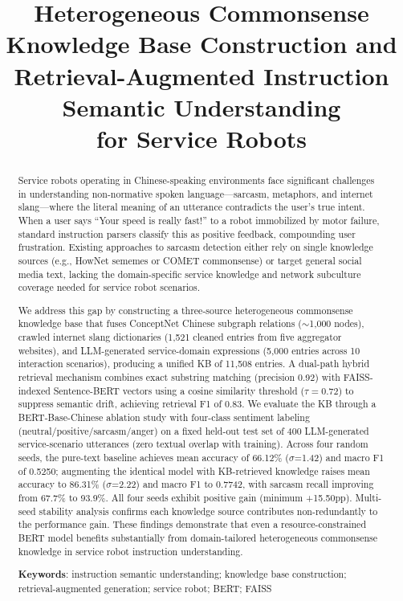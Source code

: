 \documentclass[conference]{IEEEtran}
\title{Heterogeneous Commonsense Knowledge Base Construction and \\
Retrieval-Augmented Instruction Semantic Understanding \\
for Service Robots}
\author{\IEEEauthorblockN{Anonymous Author(s)}
\IEEEauthorblockA{Anonymous Institution\\
Email: anonymous@email.com}}
\begin{document}
\maketitle

\begin{abstract}
Service robots operating in Chinese-speaking environments face significant challenges
in understanding non-normative spoken language—sarcasm, metaphors, and internet slang—where
the literal meaning of an utterance contradicts the user's true intent.
When a user says ``Your speed is really fast!'' to a robot immobilized by motor failure,
standard instruction parsers classify this as positive feedback, compounding user frustration.
Existing approaches to sarcasm detection either rely on single knowledge sources
(e.g., HowNet sememes or COMET commonsense) or target general social media text,
lacking the domain-specific service knowledge and network subculture coverage
needed for service robot scenarios.

We address this gap by constructing a three-source heterogeneous commonsense knowledge base
that fuses ConceptNet Chinese subgraph relations ($\sim$1,000 nodes),
crawled internet slang dictionaries (1,521 cleaned entries from five aggregator websites),
and LLM-generated service-domain expressions (5,000 entries across 10 interaction scenarios),
producing a unified KB of 11,508 entries.
A dual-path hybrid retrieval mechanism combines exact substring matching (precision 0.92)
with FAISS-indexed Sentence-BERT vectors using a cosine similarity threshold ($\tau=0.72$)
to suppress semantic drift, achieving retrieval F1 of 0.83.
We evaluate the KB through a BERT-Base-Chinese ablation study with four-class
sentiment labeling (neutral/positive/sarcasm/anger) on a fixed held-out test set
of 400 LLM-generated service-scenario utterances (zero textual overlap with training).
Across four random seeds, the pure-text baseline achieves mean accuracy of 66.12\%
($\sigma$=1.42) and macro F1 of 0.5250;
augmenting the identical model with KB-retrieved knowledge raises mean accuracy to
86.31\% ($\sigma$=2.22) and macro F1 to 0.7742, with sarcasm recall improving from
67.7\% to 93.9\%. All four seeds exhibit positive gain (minimum +15.50pp).
Multi-seed stability analysis confirms each knowledge source contributes
non-redundantly to the performance gain. These findings demonstrate that even a
resource-constrained BERT model benefits substantially from domain-tailored
heterogeneous commonsense knowledge in service robot instruction understanding.

\noindent\textbf{Keywords}: instruction semantic understanding; knowledge base construction;
retrieval-augmented generation; service robot; BERT; FAISS
\end{abstract}
\end{document}
